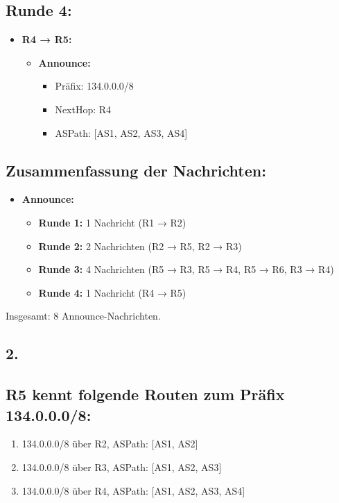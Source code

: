 \documentclass[a4paper]{scrartcl}
\begin{document}
\subsection*{Runde 4:}

\begin{itemize}
    \item \textbf{R4 → R5:}
    \begin{itemize}
        \item \textbf{Announce:}
        \begin{itemize}
            \item Präfix: 134.0.0.0/8
            \item NextHop: R4
            \item ASPath: [AS1, AS2, AS3, AS4]
        \end{itemize}
    \end{itemize}
\end{itemize}

\subsection*{Zusammenfassung der Nachrichten:}

\begin{itemize}
    \item \textbf{Announce:}
    \begin{itemize}
        \item \textbf{Runde 1:} 1 Nachricht (R1 → R2)
        \item \textbf{Runde 2:} 2 Nachrichten (R2 → R5, R2 → R3)
        \item \textbf{Runde 3:} 4 Nachrichten (R5 → R3, R5 → R4, R5 → R6, R3 → R4)
        \item \textbf{Runde 4:} 1 Nachricht (R4 → R5)
    \end{itemize}
\end{itemize}

Insgesamt: 8 Announce-Nachrichten.

\subsection*{2.}
\subsection*{R5 kennt folgende Routen zum Präfix 134.0.0.0/8:}

\begin{enumerate}
    \item 134.0.0.0/8 über R2, ASPath: [AS1, AS2]
    \item 134.0.0.0/8 über R3, ASPath: [AS1, AS2, AS3]
    \item 134.0.0.0/8 über R4, ASPath: [AS1, AS2, AS3, AS4]
\end{enumerate}
\end{document}
